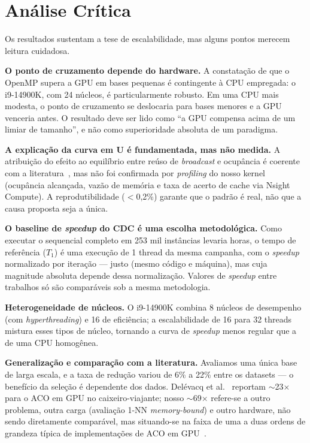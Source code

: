 \documentclass[12pt]{article}
\begin{document}
\section{Análise Crítica}

Os resultados sustentam a tese de escalabilidade, mas alguns pontos merecem leitura cuidadosa.

\textbf{O ponto de cruzamento depende do hardware.} A constatação de que o OpenMP supera a GPU em
bases pequenas é contingente à CPU empregada: o i9-14900K, com 24 núcleos, é particularmente
robusto. Em uma CPU mais modesta, o ponto de cruzamento se deslocaria para bases menores e a GPU
venceria antes. O resultado deve ser lido como ``a GPU compensa acima de um limiar de tamanho'',
e não como superioridade absoluta de um paradigma.

\textbf{A explicação da curva em U é fundamentada, mas não medida.} A atribuição do efeito ao
equilíbrio entre reúso de \textit{broadcast} e ocupância é coerente com a
literatura~\cite{volkov2010,nvidiabpg}, mas não foi confirmada por \textit{profiling} do nosso
kernel (ocupância alcançada, vazão de memória e taxa de acerto de cache via Nsight Compute). A
reprodutibilidade ($<$0,2\%) garante que o padrão é real, não que a causa proposta seja a única.

\textbf{O baseline de \textit{speedup} do CDC é uma escolha metodológica.} Como executar o
sequencial completo em 253 mil instâncias levaria horas, o tempo de referência ($T_1$) é uma
execução de 1 thread da mesma campanha, com o \textit{speedup} normalizado por iteração --- justo
(mesmo código e máquina), mas cuja magnitude absoluta depende dessa normalização. Valores de
\textit{speedup} entre trabalhos só são comparáveis sob a mesma metodologia.

\textbf{Heterogeneidade de núcleos.} O i9-14900K combina 8 núcleos de desempenho (com
\textit{hyperthreading}) e 16 de eficiência; a escalabilidade de 16 para 32 threads mistura esses
tipos de núcleo, tornando a curva de \textit{speedup} menos regular que a de uma CPU homogênea.

\textbf{Generalização e comparação com a literatura.} Avaliamos uma única base de larga escala, e
a taxa de redução variou de 6\% a 22\% entre os datasets --- o benefício da seleção é dependente
dos dados. Delévacq et al.~\cite{delevacq2013} reportam $\sim$23$\times$ para o ACO em GPU no
caixeiro-viajante; nosso $\sim$69$\times$ refere-se a outro problema, outra carga (avaliação 1-NN
\textit{memory-bound}) e outro hardware, não sendo diretamente comparável, mas situando-se na
faixa de uma a duas ordens de grandeza típica de implementações de ACO em GPU~\cite{pedemonte2011}.
\end{document}
